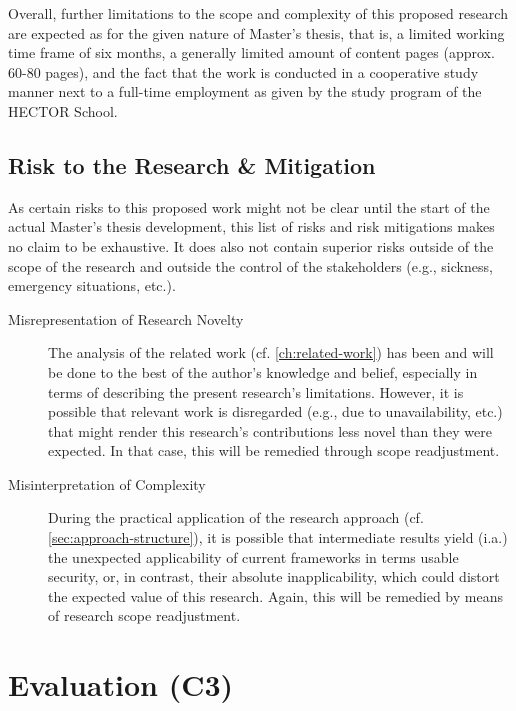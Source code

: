Overall, further limitations to the scope and complexity of this proposed research are expected as for the given nature of Master's thesis, that is, a limited working time frame of six months, a generally limited amount of content pages (approx. 60-80 pages), and the fact that the work is conducted in a cooperative study manner next to a full-time employment as given by the study program of the HECTOR School.

\section{Risk to the Research \& Mitigation} \label{sec:approach-risks}

As certain risks to this proposed work might not be clear until the start of the actual Master's thesis development, this list of risks and risk mitigations makes no claim to be exhaustive. It does also not contain superior risks outside of the scope of the research and outside the control of the stakeholders (e.g., sickness, emergency situations, etc.). 

\begin{description}
	\item[Misrepresentation of Research Novelty] The analysis of the related work (cf. \autoref{ch:related-work}) has been and will be done to the best of the author's knowledge and belief, especially in terms of describing the present research's limitations. However, it is possible that relevant work is disregarded (e.g., due to unavailability, etc.) that might render this research's contributions less novel than they were expected. In that case, this will be remedied through scope readjustment.
	\item[Misinterpretation of Complexity] During the practical application of the research approach (cf. \autoref{sec:approach-structure}), it is possible that intermediate results yield (i.a.) the unexpected applicability of current frameworks in terms usable security, or, in contrast, their absolute inapplicability, which could distort the expected value of this research. Again, this will be remedied by means of research scope readjustment.
\end{description}

\chapter{Evaluation (C3)}
\label{ch:evaluation}

